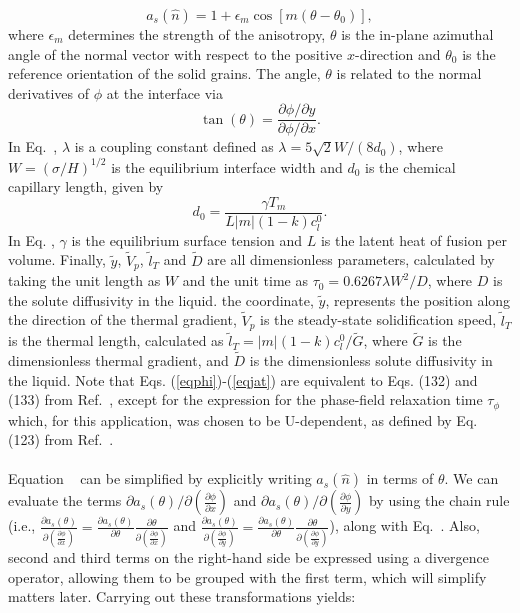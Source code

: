 \documentclass[10pt]{article}
\begin{document}
\begin{equation}
a_s(\hat{n})=1+\epsilon_m \cos[m(\theta-\theta_0)],
\end{equation}
where $\epsilon_m$ determines the strength of the anisotropy, $\theta$ is the in-plane azimuthal angle of the normal vector with respect to the positive $x$-direction and $\theta_0$ is the reference orientation of the solid grains. The angle, $\theta$ is related to the normal derivatives of $\phi$ at the interface via 
\begin{equation}
\label{taneq}
\tan(\theta) = \frac{\partial \phi / \partial y}{\partial \phi / \partial x}. 
\end{equation}
In Eq.~, $\lambda$ is a coupling constant defined as $\lambda=5\sqrt{2}W/(8d_0)$, where $W=(\sigma/H)^{1/2}$ is the equilibrium interface width and $d_0$ is the chemical capillary length, given by
\begin{equation}
\label{clength}
d_0=\frac{\gamma T_m}{L |m| (1-k) c_l^0}.
\end{equation}
In Eq. , $\gamma$ is the equilibrium surface tension and $L$ is the latent heat of fusion per volume. Finally, $\tilde{y}$, $\tilde{V}_p$, $\tilde{l}_T$ and $\tilde{D}$ are all dimensionless parameters, calculated by taking the unit length as $W$ and the unit time as $\tau_0=0.6267\lambda W^2/D$, where $D$ is the solute diffusivity in the liquid. the coordinate, $\tilde{y}$, represents the position along the direction of the thermal gradient, $\tilde{V}_p$ is the steady-state solidification speed,  $\tilde{l}_T$ is the thermal length, calculated as $\tilde{l}_T=|m|(1-k)c_l^0/\tilde{G}$, where $\tilde{G}$ is the dimensionless thermal gradient, and $\tilde{D}$ is the dimensionless solute diffusivity in the liquid. Note that Eqs. (\ref{eqphi})-(\ref{eqjat}) are equivalent to Eqs. (132) and (133) from Ref.~\cite{Echebarria2004}, except for the expression for the phase-field relaxation time $\tau_\phi$ which, for this application, was chosen to be U-dependent, as defined by Eq. (123) from Ref.~\cite{Echebarria2004}.\\
\\
Equation ~ can be simplified by explicitly writing $a_s(\hat{n})$ in terms of $\theta$.  We can evaluate the terms $\partial a_s(\theta)/\partial \left( \frac{\partial \phi}{\partial x} \right)$ and $\partial a_s(\theta)/\partial \left( \frac{\partial \phi}{\partial y} \right)$ by using the chain rule (i.e., $\frac{\partial a_s(\theta)}{\partial \left( \frac{\partial \phi}{\partial x} \right)}=\frac{\partial a_s(\theta)}{\partial \theta} \frac{\partial \theta}{\partial \left( \frac{\partial \phi}{\partial x} \right)}$  and $\frac{\partial a_s(\theta)}{\partial \left( \frac{\partial \phi}{\partial y} \right)}=\frac{\partial a_s(\theta)}{\partial \theta} \frac{\partial \theta}{\partial \left( \frac{\partial \phi}{\partial y} \right)}$), along with Eq.~. Also, second and third terms on the right-hand side be expressed using a divergence operator, allowing them to be grouped with the first term, which will simplify matters later. Carrying out these transformations yields:
\end{document}

